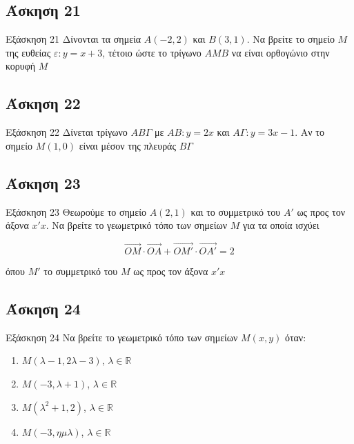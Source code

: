 \documentclass[greek]{beamer}
\begin{document}
\subsection{Άσκηση 21}
\begin{frame}[label=Άσκηση21]{Εξάσκηση 21}
 Δίνονται τα σημεία $Α(-2,2)$ και $Β(3,1)$. Να βρείτε το σημείο $Μ$ της ευθείας $ε:y=x+3$, τέτοιο ώστε το τρίγωνο $ΑΜΒ$ να είναι ορθογώνιο στην κορυφή $Μ$

\end{frame}

\subsection{Άσκηση 22}
\begin{frame}[label=Άσκηση22]{Εξάσκηση 22}
 Δίνεται τρίγωνο $ΑΒΓ$ με $ΑΒ:y=2x$ και $ΑΓ:y=3x-1$. Αν το σημείο $Μ(1,0)$ είναι μέσον της πλευράς $ΒΓ$

\end{frame}

\subsection{Άσκηση 23}
\begin{frame}[label=Άσκηση23]{Εξάσκηση 23}
 Θεωρούμε το σημείο $Α(2,1)$ και το συμμετρικό του $Α'$ ως προς τον άξονα $x'x$. Να βρείτε το γεωμετρικό τόπο των σημείων $Μ$ για τα οποία ισχύει

 $$\overrightarrow{ΟΜ}\cdot\overrightarrow{ΟΑ}+\overrightarrow{ΟΜ'}\cdot\overrightarrow{ΟΑ'}=2$$

 όπου $Μ'$ το συμμετρικό του $Μ$ ως προς τον άξονα $x'x$

\end{frame}

\subsection{Άσκηση 24}
\begin{frame}[label=Άσκηση24]{Εξάσκηση 24}
 Να βρείτε το γεωμετρικό τόπο των σημείων $Μ(x,y)$ όταν:
 \begin{enumerate}
  \item<1-> $Μ(λ-1,2λ-3)$, $λ\in\mathbb{R}$
  \item<2-> $Μ(-3,λ+1)$, $λ\in\mathbb{R}$
  \item<3-> $Μ(λ^2+1,2)$, $λ\in\mathbb{R}$
  \item<4-> $Μ(-3,ημλ)$, $λ\in\mathbb{R}$
 \end{enumerate}

\end{frame}
\end{document}
